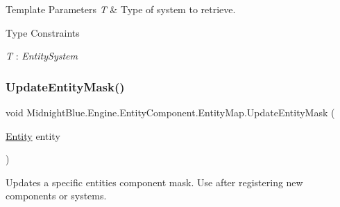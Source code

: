 \begin{DoxyTemplParams}{Template Parameters}
{\em T} & Type of system to retrieve.\\
\hline
\end{DoxyTemplParams}
\begin{Desc}
\item[Type Constraints]\begin{description}
\item[{\em T} : {\em Entity\+System}]\end{description}
\end{Desc}
\hypertarget{class_midnight_blue_1_1_engine_1_1_entity_component_1_1_entity_map_ae719ec7cdc2b4311590ca22674d47bf0}{}\label{class_midnight_blue_1_1_engine_1_1_entity_component_1_1_entity_map_ae719ec7cdc2b4311590ca22674d47bf0} 
\subsubsection{\texorpdfstring{Update\+Entity\+Mask()}{UpdateEntityMask()}}
{\footnotesize\ttfamily void Midnight\+Blue.\+Engine.\+Entity\+Component.\+Entity\+Map.\+Update\+Entity\+Mask (\begin{DoxyParamCaption}\item[{\hyperlink{class_midnight_blue_1_1_engine_1_1_entity_component_1_1_entity}{Entity}}]{entity }\end{DoxyParamCaption})\hspace{0.3cm}{\ttfamily [inline]}}



Updates a specific entities component mask. Use after registering new components or systems. 


